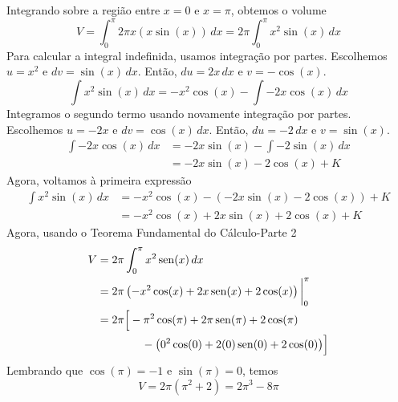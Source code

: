 \begin{example}
\begin{enumerate}[label=\alph*)]
  Integrando sobre a região entre \(x = 0\) e \(x = \pi\), obtemos o volume
  \[
    V = \int_{0}^{\pi} 2\pi x (x \sin(x)) \, dx
      = 2\pi \int_{0}^{\pi} x^2 \sin(x) \, dx
  \]
  Para calcular a integral indefinida, usamos integração por partes.
  Escolhemos \(u = x^2\) e \(dv = \sin(x) \, dx\).
  Então, \(du = 2x \, dx\) e \(v = -\cos(x)\).
  \[
    \int x^2 \sin(x) \, dx = -x^2 \cos(x) - \int -2x \cos(x) \, dx
  \]
  Integramos o segundo termo usando novamente integração por partes.
  Escolhemos \(u = -2x\) e \(dv = \cos(x) \, dx\).
  Então, \(du = -2 \, dx\) e \(v = \sin(x)\).
  \begin{align*}
    \int -2x \cos(x) \, dx
    & = -2x \sin(x) - \int -2 \sin(x) \, dx \\[2mm]
    & = -2x \sin(x) - 2 \cos(x)+K
  \end{align*}
  Agora, voltamos à primeira expressão
  \begin{align*}
    \int x^2 \sin(x) \, dx
    & = -x^2 \cos(x) - (-2x \sin(x) - 2 \cos(x))+K \\[2mm]
    & = -x^2 \cos(x) + 2x \sin(x) + 2 \cos(x)+K
  \end{align*}
  Agora, usando o Teorema Fundamental do Cálculo-Parte 2
  \begin{align*}
    V & = 2\pi \int_{0}^{\pi} x^2 \sin(x) \, dx                                     \\
      & = 2\pi \left( -x^2 \cos(x) + 2x \sin(x) + 2 \cos(x) \right) \evalat{0}{\pi} \\
      & = 2\pi \Big[ -\pi^2 \cos(\pi) + 2\pi \sin(\pi) + 2 \cos(\pi)                \\
      & \hspace{14mm} - \big(0^2 \cos(0) + 2(0) \sin(0) + 2 \cos(0)\big) \Big]
  \end{align*}
  Lembrando que \(\cos(\pi) = -1\) e \(\sin(\pi) = 0\), temos
  \[
    V = 2\pi \left( \pi^2 + 2 \right) = 2\pi^3 - 8\pi
  \]
\end{enumerate}
\end{example}

